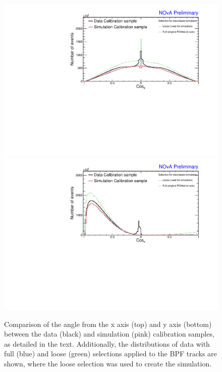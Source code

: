 \begin{figure}[!ht]
\includegraphics[width=\textwidth]{Plots/TBCalibration/DBSim_DataMCComparison_CosX.pdf}
\includegraphics[width=\textwidth]{Plots/TBCalibration/DBSim_DataMCComparison_CosY.pdf}
\caption[Data-Simulation comparison of angular distributions]{Comparison of the angle from the x axis (top) and y axis (bottom) between the data (black) and simulation (pink) calibration samples, as detailed in the text. Additionally, the distributions of data with full (blue) and loose (green) selections applied to the \acrshort{BPF} tracks are shown, where the loose selection was used to create the simulation.}
\label{fig:DataBasedSimDataMCComparison_cosXcosY}
\end{figure}

